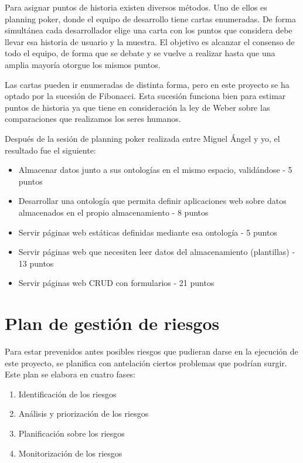 \documentclass[12pt]{report} %
\begin{document}
Para asignar puntos de historia existen diversos métodos. Uno de ellos es planning poker, donde el equipo de desarrollo tiene cartas enumeradas. De forma simultánea cada desarrollador elige una carta con los puntos que considera debe llevar esa historia de usuario y la muestra. El objetivo es alcanzar el consenso de todo el equipo, de forma que se debate y se vuelve a realizar hasta que una amplia mayoría otorgue los mismos puntos.

Las cartas pueden ir enumeradas de distinta forma, pero en este proyecto se ha optado por la sucesión de Fibonacci. Esta sucesión funciona bien para estimar puntos de historia ya que tiene en consideración la ley de Weber sobre las comparaciones que realizamos los seres humanos.\cite{fibonacci}

Después de la sesión de planning poker realizada entre Miguel Ángel y yo, el resultado fue el siguiente:

\begin{itemize}
    \item Almacenar datos junto a sus ontologías en el mismo espacio, validándose - 5 puntos
    \item Desarrollar una ontología que permita definir aplicaciones web sobre datos almacenados en el propio almacenamiento - 8 puntos
    \item Servir páginas web estáticas definidas mediante esa ontología - 5 puntos
    \item Servir páginas web que necesiten leer datos del almacenamiento (plantillas) - 13 puntos
    \item Servir páginas web CRUD con formularios - 21 puntos
\end{itemize}

\section{Plan de gestión de riesgos}

Para estar prevenidos antes posibles riesgos que pudieran darse en la ejecución de este proyecto, se planifica con antelación ciertos problemas que podrían surgir. Este plan se elabora en cuatro fases:
\begin{enumerate}
    \item Identificación de los riesgos
    \item Análisis y priorización de los riesgos
    \item Planificación sobre los riesgos
    \item Monitorización de los riesgos
\end{enumerate}
\end{document}

